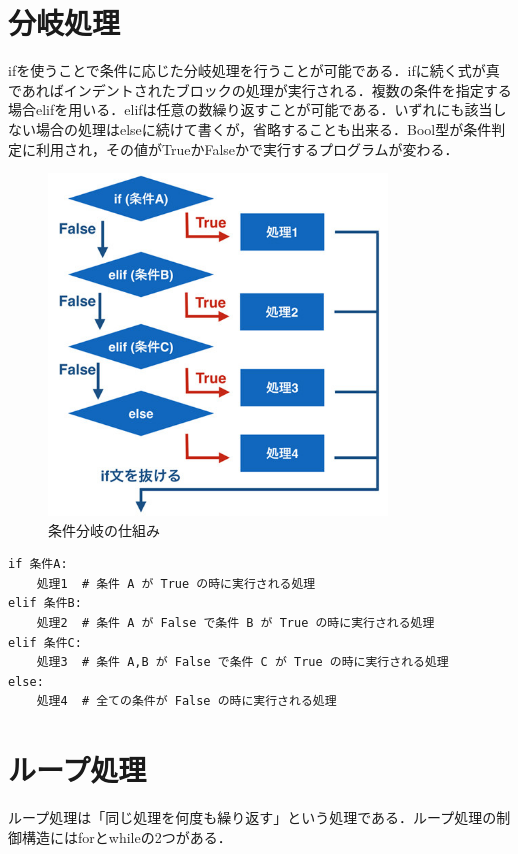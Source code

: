 \documentclass[11pt]{jarticle}
\begin{document}
\section{分岐処理}
ifを使うことで条件に応じた分岐処理を行うことが可能である．ifに続く式が真であればインデントされたブロックの処理が実行される．複数の条件を指定する場合elifを用いる．elifは任意の数繰り返すことが可能である．いずれにも該当しない場合の処理はelseに続けて書くが，省略することも出来る．Bool型が条件判定に利用され，その値がTrueかFalseかで実行するプログラムが変わる．
\begin{figure}[h]
 \centering
  \includegraphics[width=9cm]{001.jpg}
  \caption{条件分岐の仕組み}
  \label{scale}
\end{figure}
\begin{lstlisting}[basicstyle=\ttfamily\footnotesize, frame=single]
if 条件A:
    処理1  # 条件 A が True の時に実行される処理
elif 条件B:
    処理2  # 条件 A が False で条件 B が True の時に実行される処理
elif 条件C:
    処理3  # 条件 A,B が False で条件 C が True の時に実行される処理
else:
    処理4  # 全ての条件が False の時に実行される処理
\end{lstlisting}

\section{ループ処理}
ループ処理は「同じ処理を何度も繰り返す」という処理である．ループ処理の制御構造にはforとwhileの2つがある．
\end{document}
